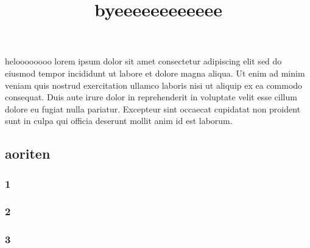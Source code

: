 \documentclass{article}
\begin{document}
heloooooooo
lorem ipsum dolor sit amet consectetur adipiscing elit sed do eiusmod tempor incididunt ut labore et dolore magna aliqua. Ut enim ad minim veniam quis nostrud exercitation ullamco laboris nisi ut aliquip ex ea commodo consequat. Duis aute irure dolor in reprehenderit in voluptate velit esse cillum dolore eu fugiat nulla pariatur. Excepteur sint occaecat cupidatat non proident sunt in culpa qui officia deserunt mollit anim id est laborum.
\title{byeeeeeeeeeeee}
\subsection*{aoriten}
\subsubsection*{1}
\subsubsection*{2}
\subsubsection*{3}
\end{document}
